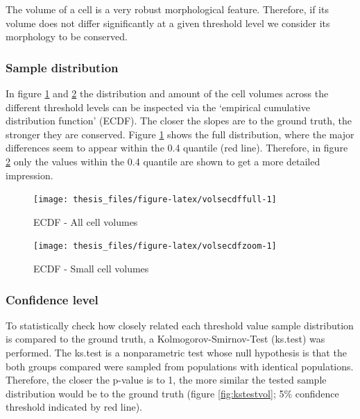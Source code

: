 \documentclass[11pt,singlespacinge,twoside]{reedthesis} %
\begin{document}
\noindent The volume of a cell is a very robust morphological feature. Therefore, if its volume does not differ significantly at a given threshold level we consider its morphology to be conserved.

\hypertarget{sample-distribution}{%
\subsubsection{Sample distribution}\label{sample-distribution}}

In figure \ref{fig:volsecdffull} and \ref{fig:volsecdfzoom} the distribution and amount of the cell volumes across the different threshold levels can be inspected via the `empirical cumulative distribution function' (ECDF). The closer the slopes are to the ground truth, the stronger they are conserved. Figure \ref{fig:volsecdffull} shows the full distribution, where the major differences seem to appear within the 0.4 quantile (red line). Therefore, in figure \ref{fig:volsecdfzoom} only the values within the 0.4 quantile are shown to get a more detailed impression.


\begin{figure}

{\centering \texttt{[image: thesis\_files/figure-latex/volsecdffull-1]} 

}

\caption{ECDF - All cell volumes}\label{fig:volsecdffull}
\end{figure}

\begin{figure}

{\centering \texttt{[image: thesis\_files/figure-latex/volsecdfzoom-1]} 

}

\caption{ECDF - Small cell volumes}\label{fig:volsecdfzoom}
\end{figure}
\hypertarget{confidence-level}{%
\subsubsection{Confidence level}\label{confidence-level}}

To statistically check how closely related each threshold value sample distribution is compared to the ground truth, a Kolmogorov-Smirnov-Test (ks.test) was performed. The ks.test is a nonparametric test whose null hypothesis is that the both groups compared were sampled from populations with identical populations. Therefore, the closer the p-value is to 1, the more similar the tested sample distribution would be to the ground truth (figure \ref{fig:kstestvol}; 5\% confidence threshold indicated by red line).
\end{document}
